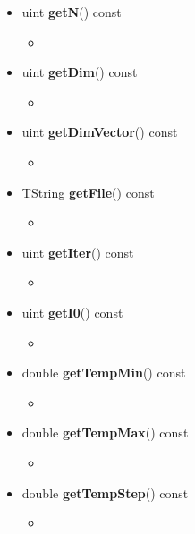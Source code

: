\documentclass[11pt,a4paper]{article}
\begin{document}
\begin{itemize}
\begin{itemize}
			\item[]  uint \textbf{getN}() const		 
			\begin{itemize}
				\item[] 
			\end{itemize}
			
			\item[]  uint \textbf{getDim}() const	 		 
			\begin{itemize}
				\item[] 
			\end{itemize}
			
			\item[]  uint \textbf{getDimVector}() const			 
			\begin{itemize}
				\item[] 
			\end{itemize}
			
			\item[] TString \textbf{getFile}() const		 
			\begin{itemize}
				\item[] 
			\end{itemize}
			
			\item[]	uint \textbf{getIter}() const		 
			\begin{itemize}
				\item[] 
			\end{itemize}
			
			\item[] uint \textbf{getI0}() const			 
			\begin{itemize}
				\item[] 
			\end{itemize}
			
			\item[] double \textbf{getTempMin}() const		 
			\begin{itemize}
				\item[] 
			\end{itemize}	
			
			\item[] double \textbf{getTempMax}() const			 
			\begin{itemize}
				\item[] 
			\end{itemize}
			
			\item[] double \textbf{getTempStep}() const			 
			\begin{itemize}
				\item[] 
			\end{itemize}
			

\end{itemize}
\end{itemize}
\end{document}

